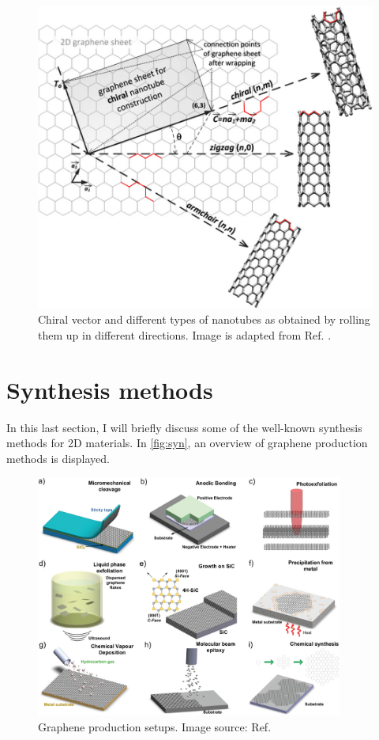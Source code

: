 \begin{figure}[htbp!] 
\centering  
\includegraphics[width=\textwidth]{chiral_vector.png}
\caption[Chiral vector and different type of nanotubes as obtained by rolling them up in different directions]{Chiral vector and different types of nanotubes as obtained by rolling them up in different directions. Image is adapted from Ref. \cite{Prasek2011}.}  
\label{fig:chiral}
\end{figure} 

\section{Synthesis methods}

In this last section, I will briefly discuss some of the well-known synthesis methods for 2D materials. In \autoref{fig:syn}, an overview of graphene production methods is displayed. 

\begin{figure}[htbp!] 
\centering  
\includegraphics[width=0.9\textwidth]{synthesis.png}
\caption[Graphene production setups]{Graphene production setups. Image source: Ref. \cite{Ferrari2015}}  
\label{fig:syn}
\end{figure} 
